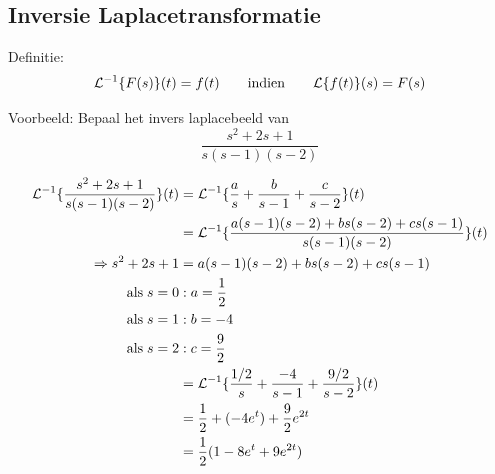 \documentclass[12pt]{report}
\newcommand{\example}[2]{
    \hrulefill
    
    Voorbeeld: #1
    
    #2
    
    \hrulefill
}
\begin{document}
\subsection{Inversie Laplacetransformatie}
Definitie:
$$\mathcal{L}^{-1}\{F(s)\}(t) = f(t) \qquad \hbox{indien} \qquad \mathcal{L}\{f(t)\}(s) = F(s)$$
\example{Bepaal het invers laplacebeeld van 
        $$\frac{s^2 + 2s + 1}{s(s-1)(s-2)}$$
    }{
        \begin{equation*}
         \begin{split}
          \mathcal{L}^{-1}\{\frac{s^2 + 2s + 1}{s(s-1)(s-2)}\}(t) & = \mathcal{L}^{-1}\{\frac{a}{s} + \frac{b}{s-1} + \frac{c}{s-2}\}(t) \\
                                                                  & = \mathcal{L}^{-1}\{\frac{a(s-1)(s-2) + bs(s-2) + cs(s-1)}{s(s-1)(s-2)}\}(t) \\
                                                       \Rightarrow s^2 + 2s + 1 & = a(s-1)(s-2) + bs(s-2) + cs(s-1) \\
                                                            \hbox{als}\;s = 0 & : a = \frac{1}{2} \\
                                                            \hbox{als}\;s = 1 & : b = -4\\
                                                            \hbox{als}\;s = 2 & : c = \frac{9}{2} \\     
                                                                  & = \mathcal{L}^{-1}\{\frac{1/2}{s} + \frac{-4}{s-1} + \frac{9/2}{s-2}\}(t) \\
                                                                  & = \frac{1}{2} + (-4e^{t}) + \frac{9}{2}e^{2t} \\
                                                                  & = \frac{1}{2}(1 - 8e^{t} + 9e^{2t})
         \end{split}
        \end{equation*}
    }
\end{document}
